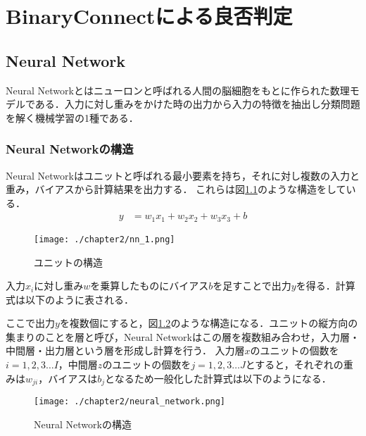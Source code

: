 
\chapter{BinaryConnectによる良否判定}

\section{Neural Network}
Neural Networkとはニューロンと呼ばれる人間の脳細胞をもとに作られた数理モデルである．入力に対し重みをかけた時の出力から入力の特徴を抽出し分類問題を解く機械学習の1種である．


\subsection{Neural Networkの構造}
Neural Networkはユニットと呼ばれる最小要素を持ち，それに対し複数の入力と重み，バイアスから計算結果を出力する．
これらは図\ref{fig_NN1}のような構造をしている．
\begin{align*}
y &= w_{1}x_{1} + w_{2}x_{2} + w_{3}x_{3} + b
\end{align*}
\begin{figure}[]
  \begin{center}
    \texttt{[image: ./chapter2/nn\_1.png]}
    \caption{ユニットの構造}
    \label{fig_NN1}
  \end{center}
\end{figure}
入力$x_i$に対し重み$w$を乗算したものにバイアス$b$を足すことで出力$y$を得る．計算式は以下のように表される．

ここで出力$y$を複数個にすると，図\ref{fig_NN}のような構造になる．ユニットの縦方向の集まりのことを層と呼び，Neural Networkはこの層を複数組み合わせ，入力層・中間層・出力層という層を形成し計算を行う．
入力層$x$のユニットの個数を$i=1,2,3\ldots I$，中間層$z$のユニットの個数を$j=1,2,3\ldots J$とすると，それぞれの重みは$w_{ji}$，バイアスは$b_j$となるため一般化した計算式は以下のようになる．
\begin{figure}[]
  \begin{center}
    \texttt{[image: ./chapter2/neural\_network.png]}
    \caption{Neural Networkの構造}
    \label{fig_NN}
  \end{center}
\end{figure}

